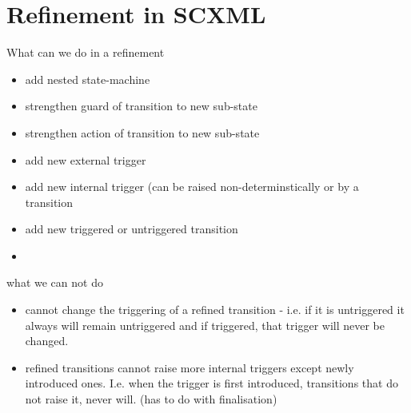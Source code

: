 \section{Refinement in SCXML}

What can we do in a refinement
\begin{itemize}
	\item add nested state-machine
	\item strengthen guard of transition to new sub-state
	\item strengthen action of transition to new sub-state
	\item add new external trigger
	\item add new internal trigger (can be raised non-determinstically or by a transition
	\item add new triggered or untriggered transition
	\item 
\end{itemize}

what we can not do
\begin{itemize}
	\item cannot change the triggering of a refined transition - i.e. if it is untriggered it always will remain untriggered and if triggered, that trigger will never be changed.
	\item refined transitions cannot raise more internal triggers except newly introduced ones. I.e. when the trigger is first introduced, transitions that do not raise it, never will. (has to do with finalisation)
\end{itemize}